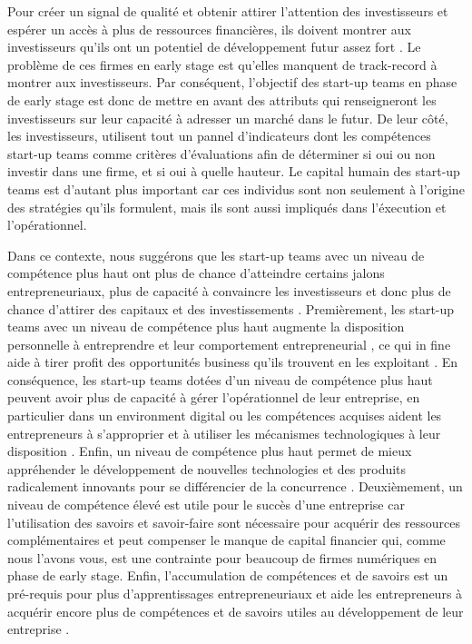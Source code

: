 \documentclass[12pt]{article}
\begin{document}
Pour créer un signal de qualité et obtenir attirer l'attention des investisseurs et espérer un accès à plus de ressources financières, ils doivent montrer aux investisseurs qu'ils ont un potentiel de développement futur assez fort \citep{colombo2021use}. Le problème de ces firmes en early stage est qu'elles manquent de track-record à montrer aux investisseurs. Par conséquent, l'objectif des start-up teams en phase de early stage est donc de mettre en avant des attributs qui renseigneront les investisseurs sur leur capacité à adresser un marché dans le futur. De leur côté, les investisseurs, utilisent tout un pannel d'indicateurs dont les compétences start-up teams comme critères d'évaluations afin de déterminer si oui ou non investir dans une firme, et si oui à quelle hauteur. Le capital humain des start-up teams est d'autant plus important car ces individus sont non seulement à l'origine des stratégies qu'ils formulent, mais ils sont aussi impliqués dans l'éxecution et l'opérationnel.

Dans ce contexte, nous suggérons que les start-up teams avec un niveau de compétence plus haut ont plus de chance d'atteindre certains jalons entrepreneuriaux, plus de capacité à convaincre les investisseurs et donc plus de chance d'attirer des capitaux et des investissements \citep{zarutskie2010role}. Premièrement, les start-up teams avec un niveau de compétence plus haut augmente la disposition personnelle à entreprendre et leur comportement entrepreneurial \citep{becherer1999proactive}, ce qui in fine aide à tirer profit des opportunités business qu'ils trouvent en les exploitant \citep{shane2000promise, chandler1994founder}. En conséquence, les start-up teams dotées d'un niveau de compétence plus haut peuvent avoir plus de capacité à gérer l'opérationnel de leur entreprise, en particulier dans un environment digital ou les compétences acquises aident les entrepreneurs à s'approprier et à utiliser les mécanismes technologiques à leur disposition \citep{nambisan2017digital}. Enfin, un niveau de compétence plus haut permet de mieux appréhender le développement de nouvelles technologies et des produits radicalement innovants pour se différencier de la concurrence \citep{marvel2007technology}. Deuxièmement, un niveau de compétence élevé est utile pour le succès d'une entreprise car l'utilisation des savoirs et savoir-faire sont nécessaire pour acquérir des ressources complémentaires et peut compenser le manque de capital financier qui, comme nous l'avons vous, est une contrainte pour beaucoup de firmes numériques en phase de early stage. Enfin, l'accumulation de compétences et de savoirs est un pré-requis pour plus d'apprentissages entrepreneuriaux et aide les entrepreneurs à acquérir encore plus de compétences et de savoirs utiles au développement de leur entreprise \citep{hunter1986cognitive}.
\end{document}
